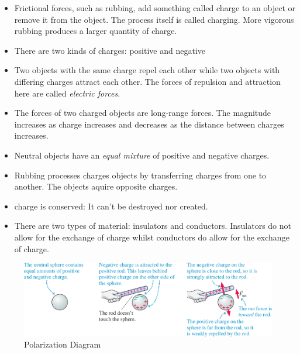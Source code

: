 \documentclass{report}
\begin{document}
\begin{itemize}
  \item Frictional forces, such as rubbing, add something called charge to an object or remove it from the object. The process itself is called charging. More vigorous rubbing produces a larger quantity of charge.
  \item There are two kinds of charges: positive and negative
  \item Two objects with the same charge repel each other while two objects with differing charges attract each other. The forces of repulsion and attraction here are called \textit{electric forces}. 
  \item The forces of two charged objects are long-range forces. The magnitude increases as charge increases and decreases as the distance between charges increases. 
  \item Neutral objects have an \textit{equal mixture} of positive and negative charges. 
  \item Rubbing processes charges objects by transferring charges from one to another. The objects aquire opposite charges. 
  \item charge is conserved: It can't be destroyed nor created.
  \item There are two types of material: insulators and conductors. Insulators do not allow for the exchange of charge whilst conductors do allow for the exchange of charge. 
\end{itemize}

\begin{figure}
  \includegraphics[width=1\textwidth]{figures/polarization_diagram.jpg}
  \caption{Polarization Diagram}
  \label{fig:diagram}
\end{figure}
\end{document}
